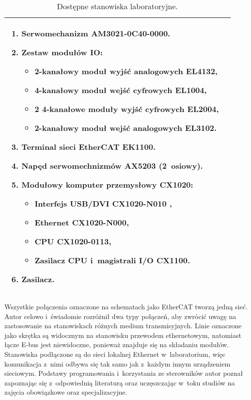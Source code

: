 \begin{table}[!htb]
\begin{center}
\begin{tabular}{| p{} | p{} |}
\begin{enumerate}[leftmargin=7mm]
\item Serwomechanizm AM3021-0C40-0000.
\item Zestaw modułów IO:
\begin{itemize}[leftmargin=3mm]
\setlength{\itemsep}{3pt}
\setlength{\parskip}{0pt}
\setlength{\parsep}{0pt}
\item 2-kanałowy moduł wyjść analogowych EL4132,
\item 4-kanałowy moduł wejść cyfrowych EL1004,
\item 2 4-kanałowe moduły wyjść cyfrowych EL2004,
\item 2-kanałowy moduł wejść analogowych EL3102.
\end{itemize}
\item Terminal sieci EtherCAT EK1100.
\item Napęd serwomechnizmów AX5203 (2~osiowy).
\item Modułowy komputer przemysłowy CX1020:
\begin{itemize}[leftmargin=3mm]
\setlength{\itemsep}{3pt}
\setlength{\parskip}{0pt}
\setlength{\parsep}{0pt}
\item Interfejs USB/DVI CX1020-N010 ,
\item Ethernet CX1020-N000,
\item CPU CX1020-0113,
\item Zasilacz CPU i~magistrali I/O CX1100.
\end{itemize}
\item Zasilacz.
\end{enumerate}
\\\hline                                            
\end{tabular}
\end{center}
\vspace*{-6mm}
  \caption{Dostępne stanowiska laboratoryjne.}
	\label{stanowiska}
\end{table}

Wszystkie połączenia oznaczone na schematach jako EtherCAT tworzą jedną sieć. Autor celowo i~świadomie rozróżnił dwa typy połączeń, aby zwrócić uwagę na zastosowanie na stanowiskach różnych medium transmisyjnych. Linie oznaczone jako skrętka są widocznym na stanowisku przewodem ethernetowym, natomiast łącze E-bus jest niewidoczne, ponieważ znajduje się na składaniu modułów.
\clearpage
Stanowiska podłączone są do sieci lokalnej Ethernet w~laboratorium, więc komunikacja z~nimi odbywa się tak samo jak z~każdym innym urządzeniem sieciowym. Podstawy programowania i~korzystania ze sterowników autor poznał zapoznając się z~odpowiednią literaturą \cite{plc1,plc2,plc4,plc5,plc6} oraz uczęszczając w~toku studiów na zajęcia obowiązkowe oraz specjalizacyjne.
